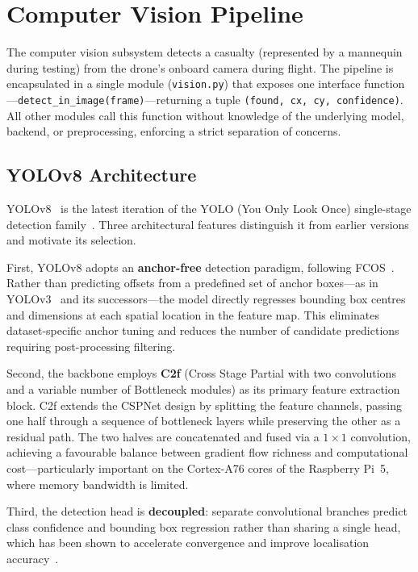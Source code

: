 \section{Computer Vision Pipeline}\label{sec:cv}

The computer vision subsystem detects a casualty (represented by a mannequin during testing) from the drone's onboard camera during flight. The pipeline is encapsulated in a single module (\texttt{vision.py}) that exposes one interface function---\texttt{detect\_in\_image(frame)}---returning a tuple \texttt{(found, cx, cy, confidence)}. All other modules call this function without knowledge of the underlying model, backend, or preprocessing, enforcing a strict separation of concerns.

\subsection{YOLOv8 Architecture}\label{sec:cv:arch}

YOLOv8~\cite{yolov8} is the latest iteration of the YOLO (You Only Look Once) single-stage detection family~\cite{yolohistory}. Three architectural features distinguish it from earlier versions and motivate its selection.

First, YOLOv8 adopts an \textbf{anchor-free} detection paradigm, following FCOS~\cite{fcos}. Rather than predicting offsets from a predefined set of anchor boxes---as in YOLOv3~\cite{yolov3} and its successors---the model directly regresses bounding box centres and dimensions at each spatial location in the feature map. This eliminates dataset-specific anchor tuning and reduces the number of candidate predictions requiring post-processing filtering.

Second, the backbone employs \textbf{C2f} (Cross Stage Partial with two convolutions and a variable number of Bottleneck modules) as its primary feature extraction block. C2f extends the CSPNet design by splitting the feature channels, passing one half through a sequence of bottleneck layers while preserving the other as a residual path. The two halves are concatenated and fused via a $1\times1$ convolution, achieving a favourable balance between gradient flow richness and computational cost---particularly important on the Cortex-A76 cores of the Raspberry Pi~5, where memory bandwidth is limited.

Third, the detection head is \textbf{decoupled}: separate convolutional branches predict class confidence and bounding box regression rather than sharing a single head, which has been shown to accelerate convergence and improve localisation accuracy~\cite{yolov8}.

